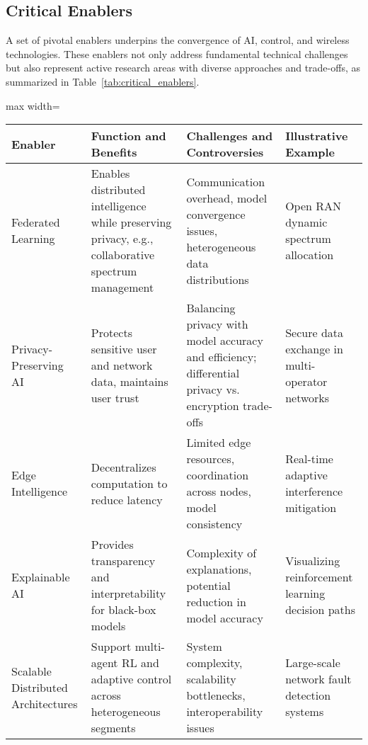 \documentclass[sigconf]{acmart}
\begin{document}
\subsection{Critical Enablers}

A set of pivotal enablers underpins the convergence of AI, control, and wireless technologies. These enablers not only address fundamental technical challenges but also represent active research areas with diverse approaches and trade-offs, as summarized in Table~\ref{tab:critical_enablers}.

\begin{table*}[htbp]
\centering
\caption{Summary and Analysis of Critical Enablers in AI-Driven Wireless Networks}
\label{tab:critical_enablers}
\begin{adjustbox}{max width=\textwidth}
\begin{tabular}{@{}llll@{}}
\toprule
\textbf{Enabler} & \textbf{Function and Benefits} & \textbf{Challenges and Controversies} & \textbf{Illustrative Example} \\ \midrule
Federated Learning & Enables distributed intelligence while preserving privacy, e.g., collaborative spectrum management & Communication overhead, model convergence issues, heterogeneous data distributions & Open RAN dynamic spectrum allocation \cite{ref49} \\
Privacy-Preserving AI & Protects sensitive user and network data, maintains user trust & Balancing privacy with model accuracy and efficiency; differential privacy vs. encryption trade-offs & Secure data exchange in multi-operator networks \\
Edge Intelligence & Decentralizes computation to reduce latency & Limited edge resources, coordination across nodes, model consistency & Real-time adaptive interference mitigation \\
Explainable AI & Provides transparency and interpretability for black-box models & Complexity of explanations, potential reduction in model accuracy \cite{ref50} & Visualizing reinforcement learning decision paths \\
Scalable Distributed Architectures & Support multi-agent RL and adaptive control across heterogeneous segments & System complexity, scalability bottlenecks, interoperability issues & Large-scale network fault detection systems \\ \bottomrule
\end{tabular}
\end{adjustbox}
\end{table*}
\end{document}
